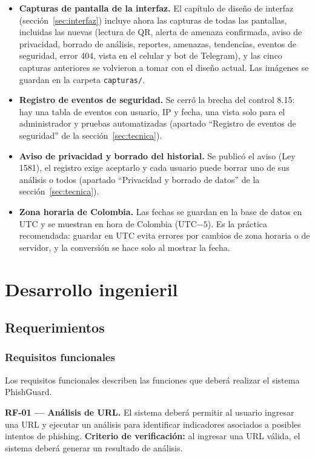 \documentclass[journal,onecolumn,12pt,draftclsnofoot]{IEEEtran}
\begin{document}
\begin{itemize}
  \item \textbf{Capturas de pantalla de la interfaz.} El capítulo de diseño de interfaz (sección~\ref{sec:interfaz}) incluye ahora las capturas de todas las pantallas, incluidas las nuevas (lectura de QR, alerta de amenaza confirmada, aviso de privacidad, borrado de análisis, reportes, amenazas, tendencias, eventos de seguridad, error 404, vista en el celular y bot de Telegram), y las cinco capturas anteriores se volvieron a tomar con el diseño actual. Las imágenes se guardan en la carpeta \texttt{capturas/}.
  \item \textbf{Registro de eventos de seguridad.} Se cerró la brecha del control 8.15: hay una tabla de eventos con usuario, IP y fecha, una vista solo para el administrador y pruebas automatizadas (apartado ``Registro de eventos de seguridad'' de la sección~\ref{sec:tecnica}).
  \item \textbf{Aviso de privacidad y borrado del historial.} Se publicó el aviso (Ley 1581), el registro exige aceptarlo y cada usuario puede borrar uno de sus análisis o todos (apartado ``Privacidad y borrado de datos'' de la sección~\ref{sec:tecnica}).
  \item \textbf{Zona horaria de Colombia.} Las fechas se guardan en la base de datos en UTC y se muestran en hora de Colombia (UTC$-5$). Es la práctica recomendada: guardar en UTC evita errores por cambios de zona horaria o de servidor, y la conversión se hace solo al mostrar la fecha.
\end{itemize}

\section{Desarrollo ingenieril}

\subsection{Requerimientos}

\subsubsection{Requisitos funcionales}

Los requisitos funcionales describen las funciones que deberá realizar el sistema PhishGuard.

\par\medskip\noindent\textbf{RF-01 --- Análisis de URL.} El sistema deberá permitir al usuario ingresar una URL y ejecutar un análisis para identificar indicadores asociados a posibles intentos de phishing. \textbf{Criterio de verificación:} al ingresar una URL válida, el sistema deberá generar un resultado de análisis.
\end{document}
